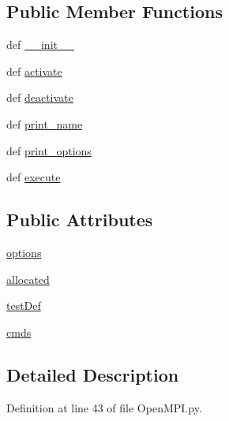 \subsection*{Public Member Functions}
\begin{DoxyCompactItemize}
\item 
def \hyperlink{class_open_m_p_i_1_1_open_m_p_i_a98c85be81f92e692e8087d08c45ebd09}{\-\_\-\-\_\-init\-\_\-\-\_\-}
\item 
def \hyperlink{class_open_m_p_i_1_1_open_m_p_i_a446b9a62139dfc9065f4cc21450ed7f9}{activate}
\item 
def \hyperlink{class_open_m_p_i_1_1_open_m_p_i_ae235afe3cd4dfc210b7e8d045a108e5b}{deactivate}
\item 
def \hyperlink{class_open_m_p_i_1_1_open_m_p_i_a3b39e0c05069fd14533b0a528ac58001}{print\-\_\-name}
\item 
def \hyperlink{class_open_m_p_i_1_1_open_m_p_i_a6a912a2ac2d80ba6ac2d6595aa661268}{print\-\_\-options}
\item 
def \hyperlink{class_open_m_p_i_1_1_open_m_p_i_a4339bc2f6d52dce9bdd0818e7ce686d2}{execute}
\end{DoxyCompactItemize}
\subsection*{Public Attributes}
\begin{DoxyCompactItemize}
\item 
\hyperlink{class_open_m_p_i_1_1_open_m_p_i_a4a263774614f0b83a63a26639b46b2f5}{options}
\item 
\hyperlink{class_open_m_p_i_1_1_open_m_p_i_a9ffab4795264fde34d136269026204db}{allocated}
\item 
\hyperlink{class_open_m_p_i_1_1_open_m_p_i_acd20b78013350c2363484589ef85b67c}{test\-Def}
\item 
\hyperlink{class_open_m_p_i_1_1_open_m_p_i_a86be93bbc775c81263813274a8564efc}{cmds}
\end{DoxyCompactItemize}


\subsection{Detailed Description}


Definition at line 43 of file Open\-M\-P\-I.\-py.



